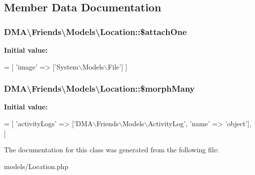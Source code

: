\subsection{Member Data Documentation}
\hypertarget{classDMA_1_1Friends_1_1Models_1_1Location_a4565a1d2e52265bc6399d13dab84c8c9}{
\subsubsection[{\$attach\+One}]{\setlength{\rightskip}{0pt plus 5cm}D\+M\+A\textbackslash{}\+Friends\textbackslash{}\+Models\textbackslash{}\+Location\+::\$attach\+One}}\label{classDMA_1_1Friends_1_1Models_1_1Location_a4565a1d2e52265bc6399d13dab84c8c9}
{\bfseries Initial value\+:}
\begin{DoxyCode}
= [
        \textcolor{stringliteral}{'image'} => [\textcolor{stringliteral}{'System\(\backslash\)Models\(\backslash\)File'}]
    ]
\end{DoxyCode}
\hypertarget{classDMA_1_1Friends_1_1Models_1_1Location_a94915d02afa4db52780159b84d9ce12e}{
\subsubsection[{\$morph\+Many}]{\setlength{\rightskip}{0pt plus 5cm}D\+M\+A\textbackslash{}\+Friends\textbackslash{}\+Models\textbackslash{}\+Location\+::\$morph\+Many}}\label{classDMA_1_1Friends_1_1Models_1_1Location_a94915d02afa4db52780159b84d9ce12e}
{\bfseries Initial value\+:}
\begin{DoxyCode}
= [ 
        \textcolor{stringliteral}{'activityLogs'}  => [\textcolor{stringliteral}{'DMA\(\backslash\)Friends\(\backslash\)Models\(\backslash\)ActivityLog'}, \textcolor{stringliteral}{'name'} => \textcolor{stringliteral}{'object'}],
    ]
\end{DoxyCode}


The documentation for this class was generated from the following file\+:\begin{DoxyCompactItemize}
\item 
models/Location.\+php\end{DoxyCompactItemize}
